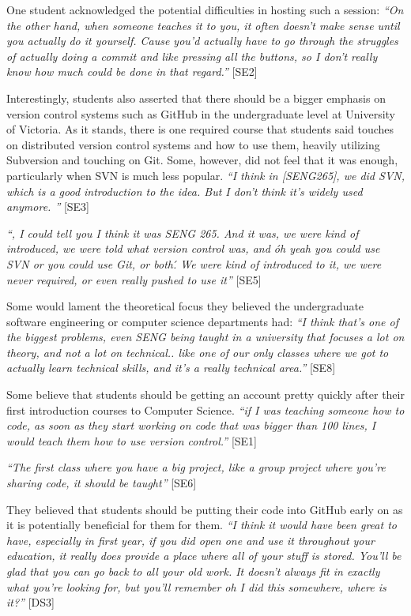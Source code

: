 One student acknowledged the potential difficulties in hosting such a session: \textit{``On the other hand, when someone teaches it to you, it often doesn't make sense until you actually do it yourself. Cause you'd actually have to go through the struggles of actually doing a commit and like pressing all the buttons, so I don't really know how much could be done in that regard.''} [SE2]

Interestingly, students also asserted that there should be a bigger emphasis on version control systems such as GitHub in the undergraduate level at University of Victoria. As it stands, there is one required course that students said touches on distributed version control systems and how to use them, heavily utilizing Subversion and touching on Git. Some, however, did not feel that it was enough, particularly when SVN is much less popular. \textit{``I think in [SENG265], we did SVN, which is a good introduction to the idea. But I don't think it's widely used anymore. ''} [SE3]

\textit{``, I could tell you I think it was SENG 265. And it was, we were kind of introduced, we were told what version control was, and \'oh yeah you could use SVN or you could use Git, or both\'. We were kind of introduced to it, we were never required, or even really pushed to use it''} [SE5]

Some would lament the theoretical focus they believed the undergraduate software engineering or computer science departments had: \textit{``I think that's one of the biggest problems, even SENG being taught in a university that focuses a lot on theory, and not a lot on technical.. like one of our only classes where we got to actually learn technical skills, and it's a really technical area.''} [SE8]

Some believe that students should be getting an account pretty quickly after their first introduction courses to Computer Science. \textit{``if I was teaching someone how to code, as soon as they start working on code that was bigger than 100 lines, I would teach them how to use version control.''} [SE1]

\textit{``The first class where you have a big project, like a group project where you're sharing code, it should be taught''} [SE6]

They believed that students should be putting their code into GitHub early on as it is potentially beneficial for them for them. \textit{``I think it would have been great to have, especially in first year, if you did open one and use it throughout your education, it really does provide a place where all of your stuff is stored. You'll be glad that you can go back to all your old work. It doesn't always fit in exactly what you're looking for, but you'll remember oh I did this somewhere, where is it?''} [DS3]

